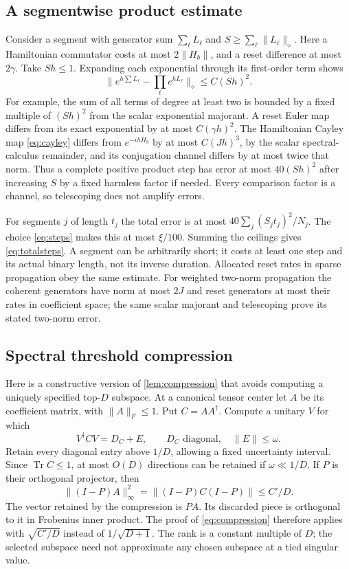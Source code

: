 \documentclass[11pt,reqno]{amsart}
\numberwithin{equation}{section}
\theoremstyle{definition}
\theoremstyle{remark}
\newcommand{\Tr}{\operatorname{Tr}}
\newcommand{\nn}[1]{\lVert#1\rVert}
\begin{document}
\subsection{A segmentwise product estimate}
Consider a segment with generator sum $\sum_\ell L_\ell$ and
$S\geq\sum_\ell\nn{L_\ell}_\diamond$. Here a Hamiltonian commutator costs at most $2\nn{H_b}$, and a reset difference at most $2\gamma$. Take $Sh\leq1$. Expanding each exponential through its first-order term shows
\[
 \nn{e^{h\sum L_\ell}-\prod_\ell e^{hL_\ell}}_\diamond
 \leq C(Sh)^2.
\]
For example, the sum of all terms of degree at least two is bounded by a fixed multiple of $(Sh)^2$ from the scalar exponential majorant. A reset Euler map differs from its exact exponential by at most $C(\gamma h)^2$. The Hamiltonian Cayley map \eqref{eq:cayley} differs from $e^{-ihH_b}$ by at most $C(Jh)^3$, by the scalar spectral-calculus remainder, and its conjugation channel differs by at most twice that norm. Thus a complete positive product step has error at most $40(Sh)^2$ after increasing $S$ by a fixed harmless factor if needed. Every comparison factor is a channel, so telescoping does not amplify errors.

For segments $j$ of length $t_j$ the total error is at most
$40\sum_j(S_jt_j)^2/N_j$. The choice \eqref{eq:steps} makes this at most $\xi/100$. Summing the ceilings gives \eqref{eq:totalsteps}. A segment can be arbitrarily short; it costs at least one step and its actual binary length, not its inverse duration. Allocated reset rates in sparse propagation obey the same estimate. For weighted two-norm propagation the coherent generators have norm at most $2J$ and reset generators at most their rates in coefficient space; the same scalar majorant and telescoping prove its stated two-norm error.

\subsection{Spectral threshold compression}
Here is a constructive version of \cref{lem:compression} that avoids computing a uniquely specified top-$D$ subspace. At a canonical tensor center let $A$ be its coefficient matrix, with $\nn A_F\leq1$. Put $C=AA^\dagger$. Compute a unitary $V$ for which
\[
 V^\dagger CV=D_C+E,\qquad D_C\text{ diagonal},\quad\nn E\leq\omega.
\]
Retain every diagonal entry above $1/D$, allowing a fixed uncertainty interval. Since $\Tr C\leq1$, at most $O(D)$ directions can be retained if $\omega\ll1/D$. If $P$ is their orthogonal projector, then
\[
 \nn{(I-P)A}_\infty^2
 =\nn{(I-P)C(I-P)}\leq C'/D.
\]
The vector retained by the compression is $PA$. Its discarded piece is orthogonal to it in Frobenius inner product. The proof of \eqref{eq:compression} therefore applies with $\sqrt{C'/D}$ instead of $1/\sqrt{D+1}$. The rank is a constant multiple of $D$; the selected subspace need not approximate any chosen subspace at a tied singular value.
\end{document}
